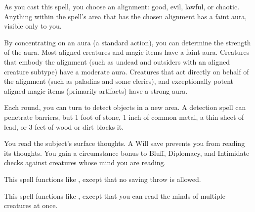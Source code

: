 \begin{spelleffect}
    As you cast this spell, you choose an alignment: good, evil, lawful, or chaotic. Anything within the spell's area that has the chosen alignment has a faint aura, visible only to you.
    
    By concentrating on an aura (a standard action), you can determine the strength of the aura. Most aligned creatures and magic items have a faint aura. Creatures that embody the alignment (such as undead and outsiders with an aligned creature subtype) have a moderate aura. Creatures that act directly on behalf of the alignment (such as paladins and some clerics), and exceptionally potent aligned magic items (primarily artifacts) have a strong aura.
\end{spelleffect}
\begin{spellnotes}
  Each round, you can turn to detect objects in a new area. A detection spell can penetrate barriers, but 1 foot of stone, 1 inch of common metal, a thin sheet of lead, or 3 feet of wood or dirt blocks it.
\end{spellnotes}

\spellrng{\rngmed}
\begin{spelleffect}
  You read the subject's surface thoughts. A Will save prevents you from reading its thoughts. You gain a  circumstance bonus to Bluff, Diplomacy, and Intimidate checks against creatures whose mind you are reading.
\end{spelleffect}

\begin{spelleffect}
    This spell functions like , except that no saving throw is allowed.
\end{spelleffect}

\begin{spelleffect}
    This spell functions like , except that you can read the minds of multiple creatures at once. 
\end{spelleffect}

